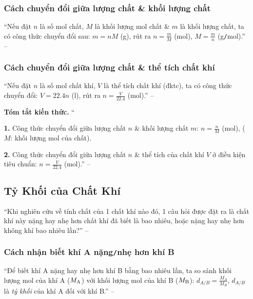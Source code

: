 \documentclass{article}
\numberwithin{equation}{section}
\begin{document}
\subsubsection{Cách chuyển đổi giữa lượng chất \& khối lượng chất}
``Nếu đặt $n$ là số mol chất, $M$ là khối lượng mol chất \& $m$ là khối lượng chất, ta có công thức chuyển đổi sau: $m = nM$ (g), rút ra $n = \frac{m}{M}$ (mol), $M = \frac{m}{n}$ (g\texttt{/}mol).'' -- \cite[p. 66]{SGK_Hoa_Hoc_8}

\subsubsection{Cách chuyển đổi giữa lượng chất \& thể tích chất khí}
``Nếu đặt $n$ là số mol chất khí, $V$ là thể tích chất khí (đktc), ta có công thức chuyển đổi: $V = 22.4n$ (l), rút ra $n = \frac{V}{22.4}$ (mol).'' -- \cite[p. 66]{SGK_Hoa_Hoc_8}
\vspace{2mm}

\noindent\textbf{Tóm tắt kiến thức.}
``\begin{enumerate*}
	\item[\textbf{1.}] Công thức chuyển đổi giữa lượng chất $n$ \& khối lượng chất $m$: $n = \frac{n}{M}$ (mol), ($M$: khối lượng mol của chất).
	\item[\textbf{2.}] Công thức chuyển đổi giữa lượng chất $n$ \& thể tích của chất khí $V$ ở điều kiện tiêu chuẩn: $n = \frac{V}{22.4}$ (mol).'' -- \cite[p. 67]{SGK_Hoa_Hoc_8}
\end{enumerate*}


\subsection{Tỷ Khối của Chất Khí}
``Khi nghiên cứu về tính chất của 1 chất khí nào đó, 1 câu hỏi được đặt ra là chất khí này nặng hay nhẹ hơn chất khí đã biết là bao nhiêu, hoặc nặng hay nhẹ hơn không khí bao nhiêu lần?'' -- \cite[p. 68]{SGK_Hoa_Hoc_8}

\subsubsection{Cách nhận biết khí A nặng\texttt{/}nhẹ hơn khí B}
``Để biết khí A nặng hay nhẹ hơn khí B bằng bao nhiêu lần, ta so sánh khối lượng mol của khí A ($M_{\rm A}$) với khối lượng mol của khí B ($M_{\rm B}$): $d_{A\texttt{/}B} = \frac{M_A}{M_B}$, $d_{A\texttt{/}B}$ là \textit{tỷ khối} của khí A đối với khí B.'' -- \cite[p. 68]{SGK_Hoa_Hoc_8}
\end{document}
